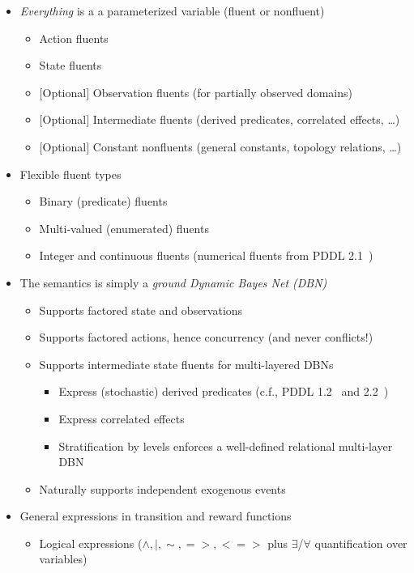 \documentclass[11pt,a4paper]{article}
\begin{document}
\begin{itemize}
\item \emph{Everything} is a a parameterized variable (fluent or nonfluent)
  \begin{itemize}
    \item Action fluents 
    \item State fluents 
    \item $[$Optional$]$ Observation fluents (for partially observed domains)
    \item $[$Optional$]$ Intermediate fluents (derived predicates, correlated effects, \ldots)
    \item $[$Optional$]$ Constant nonfluents (general constants, topology relations, \ldots)
  \end{itemize}
\item Flexible fluent types
  \begin{itemize}
    \item Binary (predicate) fluents
    \item Multi-valued (enumerated) fluents
    \item Integer and continuous fluents (numerical fluents from PDDL 2.1~\cite{pddl21})
  \end{itemize}
\item The semantics is simply a \emph{ground Dynamic Bayes Net (DBN)}
  \begin{itemize}
    \item Supports factored state and observations
    \item Supports factored actions, hence concurrency (and never conflicts!)
    \item Supports intermediate state fluents for multi-layered DBNs
       \begin{itemize}
          \item Express (stochastic) derived predicates (c.f., PDDL 1.2~\cite{pddl12} and 2.2~\cite{pddl22})
          \item Express correlated effects
          \item Stratification by levels enforces a well-defined relational multi-layer DBN
       \end{itemize}
    \item Naturally supports independent exogenous events
  \end{itemize}
\item General expressions in transition and reward functions
  \begin{itemize}
    \item Logical expressions ($\land,|,\sim,=>,<=>$ plus $\exists$/$\forall$ quantification over variables)

\end{itemize}
\end{itemize}
\end{document}
